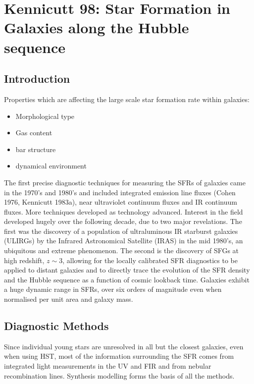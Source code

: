 \documentclass{literature}
\begin{document}

\section{Kennicutt 98: Star Formation in Galaxies along the Hubble sequence}

\subsection{Introduction}
Properties which are affecting the large scale star formation rate within galaxies: 
\begin{itemize}
\item Morphological type 
\item Gas content 
\item bar structure 
\item dynamical environment
\end{itemize}

The first precise diagnostic techniques for measuring the SFRs of galaxies came in the 1970's and 1980's and included integrated emission line fluxes (Cohen 1976, Kennicutt 1983a), near ultraviolet continuum fluxes and IR continuum fluxes. More techniques developed as technology advanced. Interest in the field developed hugely over the following decade, due to two major revelations. The first was the discovery of a population of ultraluminous IR starburst galaxies (ULIRGs) by the Infrared Astronomical Satellite (IRAS) in the mid 1980's, an ubiquitous and extreme phenomenon. The second is the discovery of SFGs at high redshift, $z \sim 3$, allowing for the locally calibrated SFR diagnostics to be applied to distant galaxies and to directly trace the evolution of the SFR density and the Hubble sequence as a function of cosmic lookback time. Galaxies exhibit a huge dynamic range in SFRs, over six orders of magnitude even when normalised per unit area and galaxy mass.

\subsection{Diagnostic Methods}
Since individual young stars are unresolved in all but the closest galaxies, even when using HST, most of the information surrounding the SFR comes from integrated light measurements in the UV and FIR and from nebular recombination lines. Synthesis modelling forms the basis of all the methods. 
\end{document}
